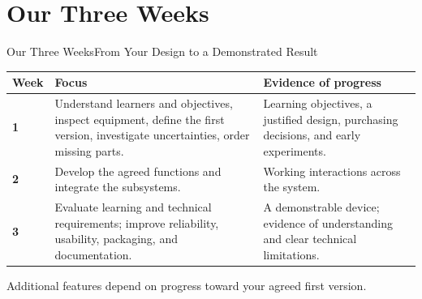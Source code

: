 \section[nosectionpage]{Our Three Weeks}
\begin{frame}{Our Three Weeks}{From Your Design to a Demonstrated Result}
\begin{center}
\end{center}
\small\renewcommand{\arraystretch}{1.3}
\par\noindent\begin{tabularx}{\textwidth}{@{}l>{\raggedright\arraybackslash}X>{\raggedright\arraybackslash}X@{}}
\toprule
\textbf{Week} & \textbf{Focus} & \textbf{Evidence of progress}\\\midrule
\textbf{1} & Understand learners and objectives, inspect equipment, define the first version, investigate uncertainties, order missing parts. & Learning objectives, a justified design, purchasing decisions, and early experiments.\\
\textbf{2} & Develop the agreed functions and integrate the subsystems. & Working interactions across the system.\\
\textbf{3} & Evaluate learning and technical requirements; improve reliability, usability, packaging, and documentation. & A demonstrable device; evidence of understanding and clear technical limitations.\\\bottomrule
\end{tabularx}\par
\vspace{.5em}\alert{Additional features depend on progress toward your agreed first version.}
\end{frame}

